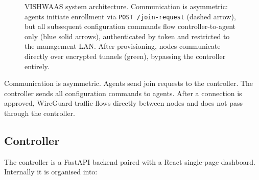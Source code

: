 \documentclass[conference]{IEEEtran}
\begin{document}
\begin{figure}[!t]
{}
\caption{VISHWAAS system architecture. Communication is asymmetric: agents
initiate enrollment via \texttt{POST /join-request} (dashed arrow), but all
subsequent configuration commands flow controller-to-agent only (blue solid
arrows), authenticated by token and restricted to the management LAN.
After provisioning, nodes communicate directly over encrypted tunnels
(green), bypassing the controller entirely.}
\label{fig:architecture}
\end{figure}

Communication is asymmetric. Agents send join requests to the controller.
The controller sends all configuration commands to agents. After a connection
is approved, WireGuard traffic flows directly between nodes and does not
pass through the controller.

\subsection{Controller}

The controller is a FastAPI backend paired with a React single-page
dashboard. Internally it is organised into:
\end{document}
